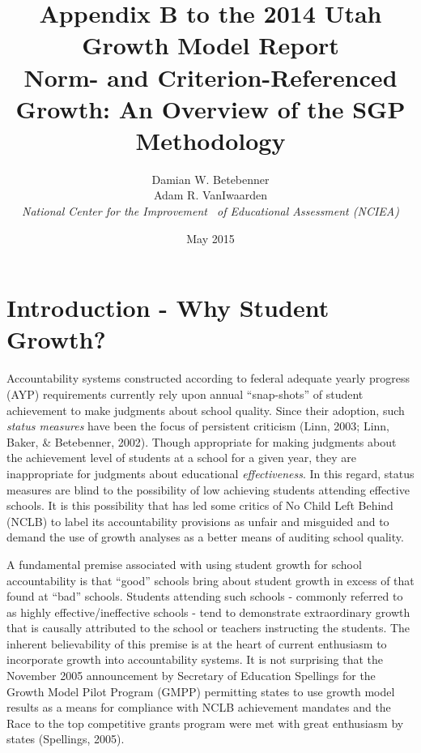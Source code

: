 \documentclass[12pt]{article}
\begin{document}
\newcommand{\pl}[1]{\textsf{PL#1}}
\newcommand{\Cov}{\ensuremath{\mbox{\textsf{Cov}}}}
\newcommand{\Diag}{\ensuremath{\mbox{\textsf{Diag}}}}
\newcommand{\Bias}{\ensuremath{\mbox{\textsf{Bias}}}}
\newcommand{\Astar}[1]{\ensuremath{#1^{^*}}}
\thispagestyle{plain}
\pagestyle{damian}

\title{\textsf{\LARGE Appendix B to the 2014 Utah Growth Model Report  \\\medskip Norm- and Criterion-Referenced Growth: An Overview of the SGP
Methodology }}
\author{  Damian W. Betebenner    \\   Adam R. VanIwaarden    \\   \emph{National Center for the Improvement \ of Educational Assessment (NCIEA)}   }

 \date{May 2015} 

\maketitle

\newpage


\section{Introduction - Why Student
Growth?}\label{introduction---why-student-growth}

Accountability systems constructed according to federal adequate yearly
progress (AYP) requirements currently rely upon annual ``snap-shots'' of
student achievement to make judgments about school quality. Since their
adoption, such \emph{status measures} have been the focus of persistent
criticism (Linn, 2003; Linn, Baker, \& Betebenner, 2002). Though
appropriate for making judgments about the achievement level of students
at a school for a given year, they are inappropriate for judgments about
educational \emph{effectiveness}. In this regard, status measures are
blind to the possibility of low achieving students attending effective
schools. It is this possibility that has led some critics of No Child
Left Behind (NCLB) to label its accountability provisions as unfair and
misguided and to demand the use of growth analyses as a better means of
auditing school quality.

A fundamental premise associated with using student growth for school
accountability is that ``good'' schools bring about student growth in
excess of that found at ``bad'' schools. Students attending such schools
- commonly referred to as highly effective/ineffective schools - tend to
demonstrate extraordinary growth that is causally attributed to the
school or teachers instructing the students. The inherent believability
of this premise is at the heart of current enthusiasm to incorporate
growth into accountability systems. It is not surprising that the
November 2005 announcement by Secretary of Education Spellings for the
Growth Model Pilot Program (GMPP) permitting states to use growth model
results as a means for compliance with NCLB achievement mandates and the
Race to the top competitive grants program were met with great
enthusiasm by states (Spellings, 2005).
\end{document}
